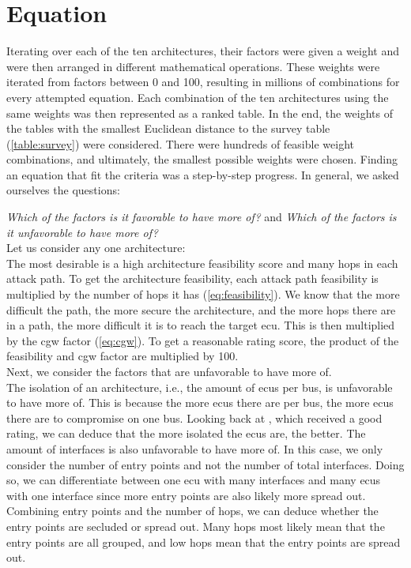 \section{Equation}
\label{sec:equation}

Iterating over each of the ten architectures, their factors were given a weight and were then arranged in different mathematical operations.
These weights were iterated from factors between 0 and 100, resulting in millions of combinations for every attempted equation.
Each combination of the ten architectures using the same weights was then represented as a ranked table. 
In the end, the weights of the tables with the smallest Euclidean distance to the survey table (\ref{table:survey}) were considered.
There were hundreds of feasible weight combinations, and ultimately, the smallest possible weights were chosen.
Finding an equation that fit the criteria was a step-by-step progress.
In general, we asked ourselves the questions:\par
\textit{Which of the factors is it favorable to have more of?} and \textit{Which of the factors is it unfavorable to have more of?}\\

Let us consider any one architecture:\\
The most desirable is a high architecture feasibility score and many hops in each attack path.
To get the architecture feasibility, each attack path feasibility is multiplied by the number of hops it has (\ref{eq:feasibility}).
We know that the more difficult the path, the more secure the architecture, and the more hops there are in a path, 
the more difficult it is to reach the target \acrshort{ecu}.
This is then multiplied by the \acrshort{cgw} factor (\ref{eq:cgw}). 
To get a reasonable rating score, the product of the feasibility and \acrshort{cgw} factor are multiplied by 100.\\

Next, we consider the factors that are unfavorable to have more of.\\
The isolation of an architecture, i.e., the amount of \acrshort{ecu}s per bus, is unfavorable to have more of.
This is because the more \acrshort{ecu}s there are per bus, the more \acrshort{ecu}s there are to compromise on one bus.
Looking back at , which received a good rating, we can deduce that the more isolated the \acrshort{ecu}s are, the better.
The amount of interfaces is also unfavorable to have more of.
In this case, we only consider the number of entry points and not the number of total interfaces.
Doing so, we can differentiate between one \acrshort{ecu} with many interfaces and many \acrshort{ecu}s with one interface since more entry points are also likely more spread out.
Combining entry points and the number of hops, we can deduce whether the entry points are secluded or spread out.
Many hops most likely mean that the entry points are all grouped, and low hops mean that the entry points are spread out.\\


